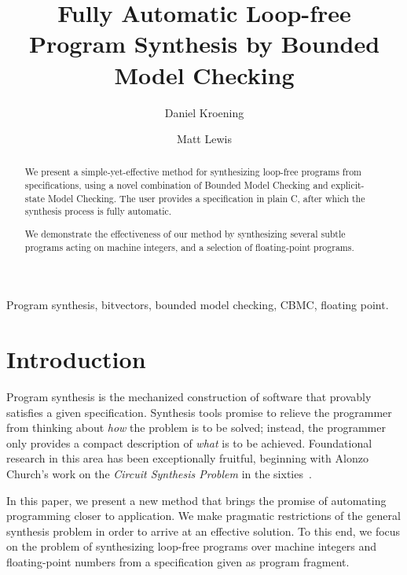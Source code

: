 \documentclass[a4paper]{llncs}
\title{Fully Automatic Loop-free Program Synthesis by Bounded Model Checking}
\author{Daniel Kroening \and Matt Lewis}
\institute{University of Oxford}
\newenvironment{keywords}{
       \list{}{\advance\topsep by0.35cm\relax\small
       \leftmargin=0cm
       \labelwidth=0.35cm
       \listparindent=0.35cm
       \itemindent\listparindent
       \rightmargin\leftmargin}\item[\hskip\labelsep
                                     \bfseries Keywords:]}
     {\endlist}
\begin{document}
%
\maketitle
%
\pagestyle{headings}  %

\begin{abstract}

We present a simple-yet-effective method for synthesizing loop-free programs
from specifications, using a novel combination of Bounded Model Checking and
explicit-state Model Checking.  The user provides a specification in plain
C, after which the synthesis process is fully automatic.

We demonstrate the effectiveness of our method by synthesizing several subtle
programs acting on machine integers, and a selection of floating-point programs.
\end{abstract}


\begin{keywords}
 Program synthesis, bitvectors, bounded model checking, CBMC,
 floating point.
\end{keywords}

\section{Introduction}

Program synthesis is the mechanized construction of software that provably
satisfies a given specification.  Synthesis tools promise to relieve the
programmer from thinking about \emph{how} the problem is to be solved;
instead, the programmer only provides a compact description of \emph{what}
is to be achieved.  Foundational research in this area has been
exceptionally fruitful, beginning with Alonzo Church's work on the
\emph{Circuit Synthesis Problem} in the sixties~\cite{church-synth}.

In this paper, we present a new method that brings the promise of
automating programming closer to application.  We make pragmatic
restrictions of the general synthesis problem in order to arrive at an
effective solution.  To this end, we focus on the problem of synthesizing
loop-free programs over machine integers and floating-point numbers from a
specification given as program fragment.
\end{document}
